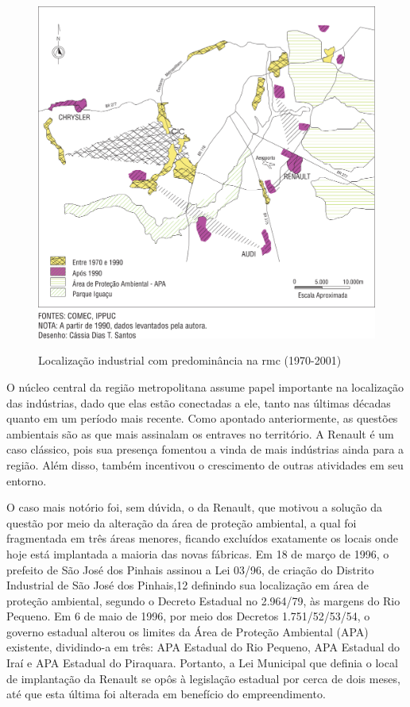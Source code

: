	\begin{figure}
		\centering
		\caption{Localização industrial com predominância na \gls{rmc} (1970-2001)}
		\includegraphics[width=1.0\linewidth]{img/firkowski2002b_01}
		\label{fig:firkowski2002b}
	\end{figure}

	O núcleo central da região metropolitana assume papel importante na localização das indústrias, dado que elas estão conectadas a ele, tanto nas últimas décadas quanto em um período mais recente.  Como apontado anteriormente, as questões ambientais são as que mais assinalam os entraves no território. A Renault é um caso clássico, pois sua presença fomentou a vinda de mais indústrias ainda para a região. Além disso, também incentivou o crescimento de outras atividades em seu entorno. 
	
	\begin{citacao}
		O caso mais notório foi, sem dúvida, o da Renault, que motivou a solução da questão por meio da alteração da área de proteção ambiental, a qual foi fragmentada em três áreas menores, ficando excluídos exatamente os locais onde hoje está implantada a maioria das novas fábricas. Em 18 de março de 1996, o prefeito de São José dos Pinhais assinou a Lei 03/96, de criação do Distrito Industrial de São José dos Pinhais,12 definindo sua localização em área de proteção ambiental, segundo o Decreto Estadual no 2.964/79, às margens do Rio Pequeno. Em 6 de maio de 1996, por meio dos Decretos 1.751/52/53/54, o governo estadual alterou os limites da Área de Proteção Ambiental (APA) existente, dividindo-a em três: APA Estadual do Rio Pequeno, APA Estadual do Iraí e APA Estadual do Piraquara. Portanto, a Lei Municipal que definia o local de implantação da Renault se opôs à legislação estadual por cerca de dois meses, até que esta última foi alterada em benefício do empreendimento. \cite[p. 96]{firkowski2002b}
	\end{citacao}

